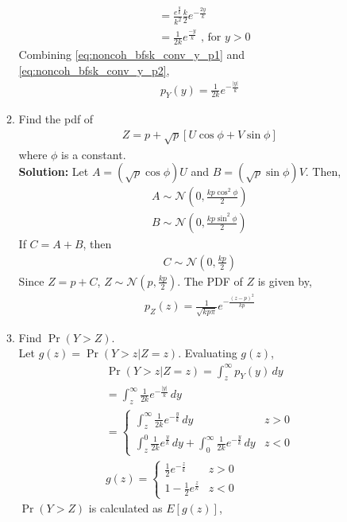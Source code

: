 \documentclass[journal,8pt,onecolumn]{IEEEtran}
\providecommand{\pr}[1]{\ensuremath{\Pr\left(#1\right)}}
\providecommand{\sbrak}[1]{\ensuremath{{}\left[#1\right]}}
\providecommand{\brak}[1]{\ensuremath{\left(#1\right)}}
\providecommand{\abs}[1]{\left\vert#1\right\vert}
\newcommand{\solution}{\noindent \textbf{Solution: }}
\providecommand{\gauss}[2]{\mathcal{N}\ensuremath{\left(#1,#2\right)}}
\begin{document}
\begin{enumerate}
\begin{enumerate}[label=(\alph{enumii})]
\begin{align}
	&= \frac{e^{\frac{y}{k}}}{k^2} \frac{k}{2}e^{-\frac{2y}{k}}\\
	\label{eq:noncoh_bfsk_conv_y_p2}
	&= \frac{1}{2k}e^{\frac{-y}{k}} \text{ , for $y > 0$}
\end{align}
Combining \eqref{eq:noncoh_bfsk_conv_y_p1} and \eqref{eq:noncoh_bfsk_conv_y_p2},
\begin{align}
p_{Y}(y) = \frac{1}{2k}e^{-\frac{\abs{y}}{k}}
\end{align}
%
\item 
 Find the pdf of 
%
\begin{align}
Z = p + \sqrt{p}\sbrak{U \cos \phi + V \sin \phi}
\end{align}
%
where $\phi$ is a constant.\\
\solution Let $A = \brak{\sqrt{p}\cos \phi} U$ and $B = \brak{\sqrt{p}\sin \phi} V$. Then,
\begin{align}
	A \sim \gauss{0}{\frac{kp \cos^2\phi}{2}}\\
	B \sim \gauss{0}{\frac{kp \sin^2\phi}{2}}
\end{align} 
If $C=A+B$, then
\begin{align}
	C \sim \gauss{0}{\frac{kp}{2}}
\end{align}
Since $Z=p+C$, $Z \sim \gauss{p}{\frac{kp}{2}}$. The PDF of $Z$ is given by,
\begin{align}
	p_{Z}\brak{z} = \frac{1}{\sqrt{kp\pi}}e^{-\frac{\brak{z-p}^2}{kp}}
\end{align}
\item 
Find $\pr{Y > Z}$.\\
Let $g\brak{z} = \pr{Y > z|Z = z}$. Evaluating $g\brak{z}$,
\begin{align}
	\pr{Y > z|Z = z} = \int_{z}^{\infty} p_Y\brak{y} \,dy\\
	= \int_{z}^{\infty} \frac{1}{2k}e^{-\frac{\abs{y}}{k}} \,dy\\
	=
	\begin{cases}
		\int_{z}^{\infty} \frac{1}{2k}e^{-\frac{y}{k}} \,dy & z > 0\\
		\int_{z}^{0} \frac{1}{2k}e^{\frac{y}{k}} \,dy + \int_{0}^{\infty} \frac{1}{2k}e^{-\frac{y}{k}}\,dy & z < 0
	\end{cases}\\
	g\brak{z} =
	\begin{cases}
		\frac{1}{2}e^{-\frac{z}{k}} & z > 0\\
		1-\frac{1}{2}e^{\frac{z}{k}}  & z < 0
	\end{cases}
\end{align}
$\pr{Y > Z}$ is calculated as $E\sbrak{g\brak{z}}$,

\end{enumerate}
\end{enumerate}
\end{document}
